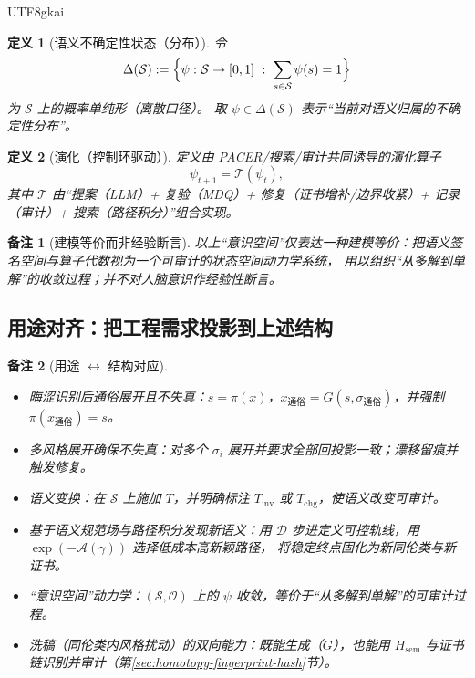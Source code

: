 \documentclass[12pt]{article}
\newtheorem{definition}{定义}[section]
\newtheorem{remark}{备注}[section]
\begin{document}
\begin{CJK*}{UTF8}{gkai}
\begin{definition}[语义不确定性状态（分布）]
令
\[
\Delta(\mathcal{S}):=\Bigl\{\psi:\mathcal{S}\to [0,1]\ :\ \sum_{s\in\mathcal{S}}\psi(s)=1\Bigr\}
\]
为 $\mathcal{S}$ 上的概率单纯形（离散口径）。
取 $\psi\in\Delta(\mathcal{S})$ 表示“当前对语义归属的不确定性分布”。
\end{definition}

\begin{definition}[演化（控制环驱动）]
定义由 PACER/搜索/审计共同诱导的演化算子
\[
\psi_{t+1}=\mathcal{T}(\psi_t),
\]
其中 $\mathcal{T}$ 由“提案（LLM）+ 复验（MDQ）+ 修复（证书增补/边界收紧）+ 记录（审计）+ 搜索（路径积分）”组合实现。
\end{definition}

\begin{remark}[建模等价而非经验断言]
以上“意识空间”仅表达一种\emph{建模等价}：把语义签名空间与算子代数视为一个可审计的状态空间动力学系统，
用以组织“从多解到单解”的收敛过程；并不对人脑意识作经验性断言。
\end{remark}

\subsection{用途对齐：把工程需求投影到上述结构}
\label{subsec:use-case-projection}

\begin{remark}[用途 $\leftrightarrow$ 结构对应]
\begin{itemize}
  \item 晦涩识别后通俗展开且不失真：$s=\pi(x)$，$x_{\text{通俗}}=G(s,\sigma_{\text{通俗}})$，并强制 $\pi(x_{\text{通俗}})=s$。
  \item 多风格展开确保不失真：对多个 $\sigma_i$ 展开并要求全部回投影一致；漂移留痕并触发修复。
  \item 语义变换：在 $\mathcal{S}$ 上施加 $T$，并明确标注 $T_{\mathrm{inv}}$ 或 $T_{\mathrm{chg}}$，使语义改变可审计。
  \item 基于语义规范场与路径积分发现新语义：用 $\mathcal{D}$ 步进定义可控轨线，用 $\exp(-\mathcal{A}(\gamma))$ 选择低成本高新颖路径，
  将稳定终点固化为新同伦类与新证书。
  \item “意识空间”动力学：$(\mathcal{S},\mathcal{O})$ 上的 $\psi$ 收敛，等价于“从多解到单解”的可审计过程。
  \item 洗稿（同伦类内风格扰动）的双向能力：既能生成（$G$），也能用 $H_{\mathrm{sem}}$ 与证书链识别并审计（第\ref{sec:homotopy-fingerprint-hash}节）。
\end{itemize}
\end{remark}


\end{CJK*}
\end{document}
